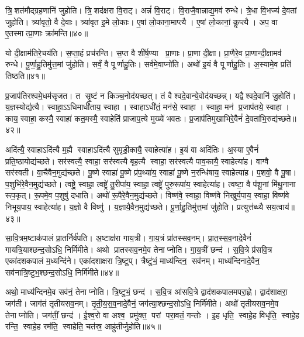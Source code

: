 त्रि॒शत॑मौद्ग्रह॒णानि॑ जुहोति। त्रि॒शद॑क्षरा वि॒राट्। अन्नं॑ वि॒राट्। वि॒राजै॒वान्नाद्य॒मव॑ रुन्धे। त्रे॒धा वि॒भज्य॑ दे॒वतां जुहोति। त्र्या॑वृतो॒ वै दे॒वाः। त्र्या॑वृत इ॒मे लो॒काः। ए॒षां लो॒काना॒माप्त्यै। ए॒षां लो॒कानां॒ कॢप्त्यै। अप॒ वा ए॒तस्मात्प्रा॒णाः क्रा॑मन्ति॥४०॥

यो दी॒क्षाम॑तिरे॒चय॑ति। स॒प्ता॒हं प्रच॑रन्ति। स॒प्त वै शी॑र्\mbox{}ष॒ण्या प्रा॒णाः। प्रा॒णा दी॒क्षा। प्रा॒णैरे॒व प्रा॒णान्दी॒क्षामव॑ रुन्धे। पू॒र्णा॒हु॒तिमु॑त्त॒मां जु॑होति। सर्वं॒ वै पूर्णाहु॒तिः। सर्व॑मे॒वाप्नो॑ति। अथो॑ इ॒यं वै पूर्णाहु॒तिः। अ॒स्यामे॒व प्रति॑ तिष्ठति॥४१॥\anuvakamend[रु॒न्धे॒ प्रा॒णान्दी॒क्षामव॑ रुन्ध उच्यते क्रामन्ति तिष्ठति]

प्र॒जाप॑तिरश्वमे॒धम॑सृजत। त सृ॒ष्टं न किञ्च॒नोद॑यच्छत्। तं वैश्वदे॒वान्ये॒वोद॑यच्छन्न्। यद्वैश्वदे॒वानि॑ जु॒होति॑। य॒ज्ञस्योद्य॑त्यै। स्वाहा॒ऽऽधिमाधी॑ताय॒ स्वाहा। स्वाहाऽधी॑तं॒ मन॑से॒ स्वाहा। स्वाहा॒ मन॑ प्र॒जाप॑तये॒ स्वाहा। काय॒ स्वाहा॒ कस्मै॒ स्वाहा॑ कत॒मस्मै॒ स्वाहेति॑ प्राजाप॒त्ये मुख्ये॑ भवतः। प्र॒जाप॑तिमुखाभिरे॒वैनं॑ दे॒वता॑भि॒रुद्य॑च्छते॥४२॥

अदि॑त्यै॒ स्वाहाऽदि॑त्यै म॒ह्यै स्वाहाऽदि॑त्यै सुमृडी॒कायै॒ स्वाहेत्या॑ह। इ॒यं वा अदि॑तिः। अ॒स्या ए॒वैनं॑ प्रति॒ष्ठायोद्य॑च्छते। सर॑स्वत्यै॒ स्वाहा॒ सर॑स्वत्यै बृह॒त्यै स्वाहा॒ सर॑स्वत्यै पाव॒कायै॒ स्वाहेत्या॑ह। वाग्वै सर॑स्वती। वा॒चैवैन॒मुद्य॑च्छते। पू॒ष्णे स्वाहा॑ पू॒ष्णे प्र॑प॒थ्या॑य॒ स्वाहा॑ पू॒ष्णे न॒रन्धि॑षाय॒ स्वाहेत्या॑ह। प॒शवो॒ वै पू॒षा। प॒शुभि॑रे॒वैन॒मुद्य॑च्छते। त्वष्ट्रे॒ स्वाहा॒ त्वष्ट्रे॑ तु॒रीपा॑य॒ स्वाहा॒ त्वष्ट्रे॑ पुरु॒रूपा॑य॒ स्वाहेत्या॑ह। त्वष्टा॒ वै प॑शू॒नां मि॑थु॒नाना रूप॒कृत्। रू॒पमे॒व प॒शुषु॑ दधाति। अथो॑ रू॒पैरे॒वैन॒मुद्य॑च्छते। विष्ण॑वे॒ स्वाहा॒ विष्ण॑वे निखुर्य॒पाय॒ स्वाहा॒ विष्ण॑वे निभूय॒पाय॒ स्वाहेत्या॑ह। य॒ज्ञो वै विष्णु॑। य॒ज्ञायै॒वैन॒मुद्य॑च्छते। पू॒र्णा॒हु॒तिमु॑त्त॒मां जु॑होति। प्रत्युत्त॑ब्ध्यै सय॒त्वाय॑॥४३॥\anuvakamend[य॒च्छ॒ते॒ पु॒रु॒रूपा॑य॒ स्वाहेत्या॑हा॒ष्टौ च॑]

सा॒वि॒त्रम॒ष्टाक॑पालं प्रा॒तर्निर्व॑पति। अ॒ष्टाक्ष॑रा गाय॒त्री। गा॒य॒त्रं प्रा॑तस्सव॒नम्। प्रा॒त॒स्स॒व॒नादे॒वैनं॑ गायत्रि॒याश्छन्द॒सोऽधि॒ निर्मि॑मीते। अथो प्रातस्सव॒नमे॒व तेनाप्नोति। गा॒य॒त्रीं छन्द॑। स॒वि॒त्रे प्र॑सवि॒त्र एका॑दशकपालं म॒ध्यन्दि॑ने। एका॑दशाक्षरा त्रि॒ष्टुप्। त्रैष्टु॑भं॒ माध्य॑न्दिन॒ सव॑नम्। माध्य॑न्दिनादे॒वैन॒ सव॑नात्रि॒ष्टुभ॒श्छन्द॒सोऽधि॒ निर्मि॑मीते॥४४॥

अथो॒ माध्य॑न्दिनमे॒व सव॑नं॒ तेनाप्नोति। त्रि॒ष्टुभं॒ छन्द॑। स॒वि॒त्र आ॑सवि॒त्रे द्वाद॑शकपालमपरा॒ह्णे। द्वाद॑शाक्षरा॒ जग॑ती। जाग॑तं तृतीयसव॒नम्। तृ॒ती॒य॒स॒व॒नादे॒वैनं॒ जग॑त्या॒श्छन्द॒सोऽधि॒ निर्मि॑मीते। अथो॑ तृतीयसव॒नमे॒व तेनाप्नोति। जग॑तीं॒ छन्द॑। ई॒श्व॒रो वा अश्व॒ प्रमु॑क्त॒ परां परा॒वतं॒ गन्तोः। इ॒ह धृति॒ स्वाहे॒ह विधृ॑ति॒ स्वाहे॒ह रन्ति॒ स्वाहे॒ह रम॑ति॒ स्वाहेति॒ चत॑स्र॒ आहु॑तीर्जुहोति॥४५॥

